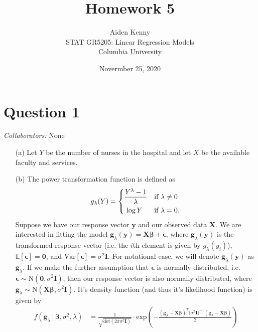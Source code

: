 \documentclass[10pt]{article}
\title{
    {\Large Homework 5}
}
\author{
    {\normalsize Aiden Kenny}\\
    {\normalsize STAT GR5205: Linear Regression Models}\\
    {\normalsize Columbia University}
}
\date{\normalsize Novermber 25, 2020}
\newcommand{\mycolaba}[1]{\textcolor{colabcol}{\textsl{Collaborators:}} #1}
\begin{document}
\maketitle

\newcommand{\myg}{\mathbf{g}_{\lambda}}
\newcommand{\mygfull}{\mathbf{g}_{\lambda}(\mathbf{y})}
\section{Question 1} \noindent
\mycolaba{None}
\begin{itemize}
    \item[(a)] Let \(Y\) be the number of nurses in the hospital and let \(X\) be the available faculty and services. 
    \item[(b)] The power transformation function is defined as 
    \begin{align*}
        g_{\lambda}(Y) 
        = \begin{dcases}
            \frac{Y^{\lambda} - 1}{\lambda} & \text{if } \lambda \neq 0 \\
            ~\log Y & \text{if } \lambda = 0.
        \end{dcases}
    \end{align*}
    Suppose we have our response vector \(\mathbf{y}\) and our observed data \(\mathbf{X}\). 
    We are interested in fitting the model \(\mathbf{g}_{\lambda}(\mathbf{y}) = \mathbf{X}\bm{\beta} + \bm{\epsilon}\), where \(\mathbf{g}_{\lambda}(\mathbf{y})\)
    is the transformed response vector (i.e. the \(i\)th element is given by \(g_{\lambda}(y_i)\)), \(\mathbb{E}[\bm{\epsilon}] = \mathbf{0}\), and 
    \(\mathrm{Var}[\bm{\epsilon}] = \sigma^2 \mathbf{I}\). 
    For notational ease, we will denote \(\mygfull\) as \(\myg\). 
    If we make the further assumption that \(\bm{\epsilon}\) is normally distributed, i.e. 
    \(\bm{\epsilon} \sim \mathrm{N}(\mathbf{0}, \sigma^2 \mathbf{I})\), then our response vector is also normally distributed, where
    \(\myg \sim \mathrm{N}(\mathbf{X}\bm{\beta}, \sigma^2 \mathbf{I})\). It's density function (and thus it's likelihood function) is given by 
    \begin{align*}
        f(\myg \,|\, \bm{\beta}, \sigma^2, \lambda)
        &= \frac{1}{\sqrt{\mathrm{det}(2 \pi \sigma^2 \mathbf{I})}} \cdot \mathrm{exp} \left( - \frac{(\myg - \mathbf{X}\bm{\beta})^T \big( \sigma^2 \mathbf{I} \big)^{-1} (\myg - \mathbf{X}\bm{\beta})}{2} \right) \\

\end{align*}
\end{itemize}
\end{document}
